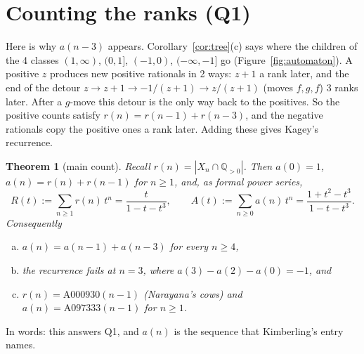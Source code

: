 \documentclass[11pt]{article}
\newtheorem{theorem}{Theorem}[section]
\theoremstyle{definition}
\theoremstyle{remark}
\newcommand{\Q}{\mathbb{Q}}
\newcommand{\Qpos}{\Q_{>0}}
\begin{document}
\section{Counting the ranks (Q1)}\label{sec:count}

Here is why $a(n-3)$ appears. Corollary~\ref{cor:tree}(c) says where the children of the 4
classes $(1,\infty)$, $(0,1]$, $(-1,0)$, $(-\infty,-1]$ go (Figure~\ref{fig:automaton}). A positive
$z$ produces new positive rationals in 2 ways: $z+1$ a rank later, and the end of the detour
$z\to z+1\to-1/(z+1)\to z/(z+1)$ (moves $f,g,f$) 3 ranks later. After a $g$-move this detour is
the only way back to the positives. So the positive counts satisfy $r(n)=r(n-1)+r(n-3)$, and the
negative rationals copy the positive ones a rank later. Adding these gives Kagey's recurrence.

\begin{theorem}[main count]\label{thm:main}
Recall $r(n)=|X_n\cap\Qpos|$. Then $a(0)=1$, $a(n)=r(n)+r(n-1)$ for $n\ge1$, and, as formal power
series,
\[
R(t):=\sum_{n\ge1}r(n)\,t^n=\frac{t}{1-t-t^3},
\qquad
A(t):=\sum_{n\ge0}a(n)\,t^n=\frac{1+t^2-t^3}{1-t-t^3}.
\]
Consequently
\begin{enumerate}[(a)]
\item $a(n)=a(n-1)+a(n-3)$ for every $n\ge4$,
\item the recurrence fails at $n=3$, where $a(3)-a(2)-a(0)=-1$, and
\item $r(n)=\mathrm{A000930}(n-1)$ \emph{(Narayana's cows)} and $a(n)=\mathrm{A097333}(n-1)$ for $n\ge1$.
\end{enumerate}
\end{theorem}

In words: this answers Q1, and $a(n)$ is the sequence that Kimberling's entry names.
\end{document}
